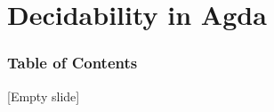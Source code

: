 \section{Decidability in Agda}
\begin{frame}
\frametitle{Table of Contents}
\tableofcontents[currentsection]
\end{frame}

\begin{frame}{}{}
  {[Empty slide]}
\end{frame}
